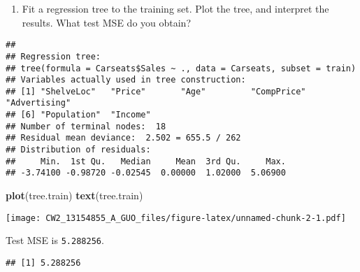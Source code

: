 \documentclass[]{article}
\newenvironment{Shaded}{\begin{snugshade}}{\end{snugshade}}
\newcommand{\KeywordTok}[1]{\textcolor[rgb]{0.13,0.29,0.53}{\textbf{#1}}}
\newcommand{\DataTypeTok}[1]{\textcolor[rgb]{0.13,0.29,0.53}{#1}}
\newcommand{\DecValTok}[1]{\textcolor[rgb]{0.00,0.00,0.81}{#1}}
\newcommand{\OperatorTok}[1]{\textcolor[rgb]{0.81,0.36,0.00}{\textbf{#1}}}
\newcommand{\NormalTok}[1]{#1}
\providecommand{\tightlist}{%
  \setlength{\itemsep}{0pt}\setlength{\parskip}{0pt}}
\begin{document}
\begin{enumerate}
\def\labelenumi{(\alph{enumi})}
\setcounter{enumi}{1}
\tightlist
\item
  Fit a regression tree to the training set. Plot the tree, and
  interpret the results. What test MSE do you obtain?
\end{enumerate}

\begin{Shaded}
\end{Shaded}

\begin{verbatim}
## 
## Regression tree:
## tree(formula = Carseats$Sales ~ ., data = Carseats, subset = train)
## Variables actually used in tree construction:
## [1] "ShelveLoc"   "Price"       "Age"         "CompPrice"   "Advertising"
## [6] "Population"  "Income"     
## Number of terminal nodes:  18 
## Residual mean deviance:  2.502 = 655.5 / 262 
## Distribution of residuals:
##     Min.  1st Qu.   Median     Mean  3rd Qu.     Max. 
## -3.74100 -0.98720 -0.02545  0.00000  1.02000  5.06900
\end{verbatim}

\begin{Shaded}
\begin{Highlighting}[]
\KeywordTok{plot}\NormalTok{(tree.train)}
\KeywordTok{text}\NormalTok{(tree.train)}
\end{Highlighting}
\end{Shaded}

\texttt{[image: CW2\_13154855\_A\_GUO\_files/figure-latex/unnamed-chunk-2-1.pdf]}

Test MSE is \texttt{5.288256}.

\begin{Shaded}
\end{Shaded}

\begin{verbatim}
## [1] 5.288256
\end{verbatim}
\end{document}
